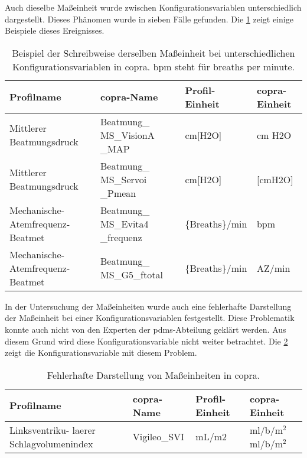Auch dieselbe Maßeinheit wurde zwischen Konfigurationsvariablen unterschiedlich dargestellt. Dieses Phänomen wurde in sieben Fälle gefunden. Die \ref{tab:unitscopra} zeigt einige Beispiele dieses Ereignisses.

\begin{table}[ht]
	\centering
	\caption[Beispiel der Schreibweise derselben Maßeinheit in \acs{copra}]{Beispiel der Schreibweise derselben Maßeinheit bei unterschiedlichen Konfigurationsvariablen in \acs{copra}. bpm steht für \glqq breaths per minute\grqq{}.}
	\label{tab:unitscopra}
	\begin{tabular}{|p{3cm}|p{3cm}|l|l|} \hline
		\bfseries Profilname & \bfseries \ac{copra}-Name & \bfseries Profil-Einheit &  \bfseries \ac{copra}-Einheit \\ \hline
		Mittlerer Beatmungsdruck & Beatmung\_ MS\_VisionA \_MAP & cm[H2O] & cm H2O \\ \hline
		Mittlerer Beatmungsdruck & Beatmung\_ MS\_Servoi \_Pmean & cm[H2O] & [cmH2O] \\ \hline \hline
		Mechanische-Atemfrequenz-Beatmet & Beatmung\_ MS\_Evita4 \_frequenz & \{Breaths\}/min & bpm \\ \hline
		Mechanische-Atemfrequenz-Beatmet & Beatmung\_ MS\_G5\_ftotal & \{Breaths\}/min & AZ/min \\ \hline
	\end{tabular}
\end{table}

In der Untersuchung der Maßeinheiten wurde auch eine fehlerhafte Darstellung der Maßeinheit bei einer Konfigurationsvariablen festgestellt. Diese Problematik konnte auch nicht von den Experten der \ac{pdms}-Abteilung geklärt werden. Aus diesem Grund wird diese Konfigurationsvariable nicht weiter betrachtet. Die \ref{tab:errounit} zeigt die Konfigurationsvariable mit diesem Problem.

\clearpage

\begin{table}[ht]
	\centering
	\caption[Fehlerhafte Darstellung von Maßeinheiten in \acs{copra}]{Fehlerhafte Darstellung von Maßeinheiten in \acs{copra}.}
	\label{tab:errounit}
	\begin{tabular}{|p{3cm}|p{3cm}|l|l|} \hline
		\bfseries Profilname & \bfseries \ac{copra}-Name & \bfseries Profil-Einheit & \bfseries \ac{copra}-Einheit \\ \hline
		Linksventriku- laerer Schlagvolumenindex & Vigileo\_SVI & mL/m2 & ml/b/m$^2$ml/b/m$^2$ \\ \hline
	\end{tabular}
\end{table}

